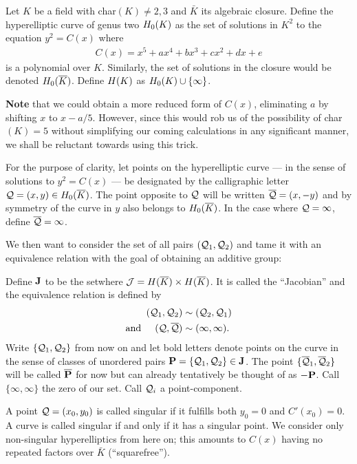 \documentclass[english,11pt,a4paper]{article}
\begin{document}
\begin{defin}
  Let $K$ be a field with char$(K) \neq 2, 3$ and $\bar K$ its algebraic closure. Define the hyperelliptic curve of genus two $\enk$ as the set of solutions in $K^2$ to the equation $y^2=C(x)$ where
  \begin{align*}
    C(x)=x^5+ax^4+bx^3+cx^2+dx+e
  \end{align*}
  is a polynomial over $K$. Similarly, the set of solutions in the closure would be denoted $\enkb$.  Define $\ek$ as $\enk \cup \{ \infty \}$.

  \textbf{Note} that we could obtain a more reduced form of $C(x)$, eliminating $a$ by shifting $x$ to $x-a/5$. However, since this would rob us of the possibility of char$(K) = 5$ without simplifying our coming calculations in any significant manner, we shall be reluctant towards using this trick.

  For the purpose of clarity, let points on the hyperelliptic curve --- in the sense of solutions to $y^2=C(x)$ --- be designated by the calligraphic letter $\q=(x,y) \in \enkb$. The point opposite to $\q$ will be written $\bar \q = (x,-y)$ and by symmetry of the curve in $y$ also belongs to $\enkb$. In the case where $\q = \infty$, define $\bar \q = \infty$.

  We then want to consider the set of all pairs $(\q_1,\q_2)$ and tame it with an equivalence relation with the goal of obtaining an additive group:
\end{defin}
\begin{defin}\label{defj}
  Define $\J$ to be the set\scalebox{1.3}{ $\nicefrac{ \j }{\sim }$ }where $\j = \ekb \times \ekb$. It is called the ``Jacobian'' and the equivalence relation is defined by
  \begin{align*}
    (\q_1,\q_2) &\sim (\q_2,\q_1) \\
    \text{and\hspace{5mm}} (\q,\bar \q) & \sim ( \infty , \infty ). 
  \end{align*}
  Write $\{ \q_1,\q_2 \}$ from now on and let bold letters denote points on the curve in the sense of classes of unordered pairs $\P =\{ \q_1, \q_2 \} \in \J$. The point $\{ \bar \q_1, \bar \q_2 \}$ will be called $\bar \P$ for now but can already tentatively be thought of as $-\P$. Call $\{ \infty, \infty \}$ the zero of our set. Call $\q_i$ a point-component.

  A point $\q = (x_0,y_0)$ is called singular if it fulfills both $y_0=0$ and $C'(x_0) = 0$. A curve is called singular if and only if it has a singular point. We consider only non-singular hyperelliptics from here on; this amounts to $C(x)$ having no repeated factors over $\bar K$ (``squarefree'').
\end{defin}
\end{document}
